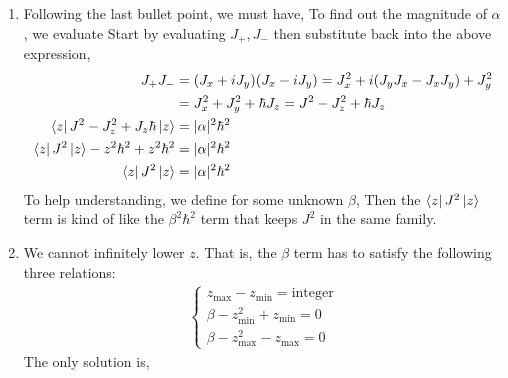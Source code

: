 \documentclass{school-22.101-notes}
\begin{document}
\begin{enumerate}
\begin{enumerate}
  \item Following the last bullet point, we must have, 
    To find out the magnitude of $\alpha$, we evaluate
    Start by evaluating $J_+, J_-$ then substitute back into the above expression, 
    \begin{align}
      J_+ J_- &= (J_x + i J_y) (J_x - iJ_y) = J_x^2 + i (J_y J_x - J_x J_y) + J_y^2 \\
      &= J_x^2 + J_y^2 + \hbar J_z = J^2 - J_z^2 + \hbar J_z \\
      \left< z \right| J^2 - J_z^2 + J_z \hbar \left| z \right> &= |\alpha|^2 \hbar^2 \\
      \left< z \right| J^2 \left| z \right> - z^2 \hbar^2 + z^2 \hbar^2 &= |\alpha|^2 \hbar^2 \\
      \left< z \right| J^2 \left| z \right> &= |\alpha|^2 \hbar^2 
    \end{align}
    To help understanding, we define for some unknown $\beta$, 
    Then the $\left< z \right| J^2 \left| z \right>$ term is kind of like the $\beta^2 \hbar^2$ term that keeps $J^2$ in the same family. 

  \item We cannot infinitely lower $z$. That is, the $\beta$ term has to satisfy the following three relations: 
    \begin{align}
      \left\{ \begin{array}{c} 
        z_{\max} - z_{\min} = \mathrm{integer}  \\
        \beta - z_{\min}^2 + z_{\min} = 0 \\
        \beta - z_{\max}^2 - z_{\max} = 0
      \end{array}
      \right. 
    \end{align}
    The only solution is, 


\end{enumerate}
\end{enumerate}
\end{document}
